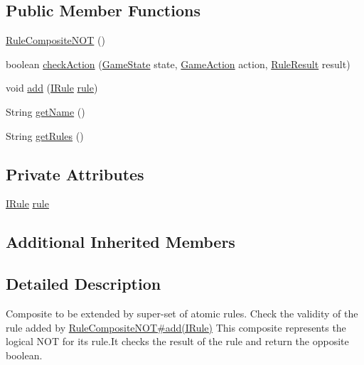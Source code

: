 \subsection*{Public Member Functions}
\begin{DoxyCompactItemize}
\item 
\mbox{\hyperlink{classrule_engine_1_1rules_1_1new_rules_1_1_rule_composite_n_o_t_a561e4770066c3d1791cf2541e909ad1e}{Rule\+Composite\+N\+OT}} ()
\item 
boolean \mbox{\hyperlink{classrule_engine_1_1rules_1_1new_rules_1_1_rule_composite_n_o_t_a58fe12e7cdc5cdcff6d0df2c67ecedb8}{check\+Action}} (\mbox{\hyperlink{classgame_1_1game_state_1_1_game_state}{Game\+State}} state, \mbox{\hyperlink{classrule_engine_1_1_game_action}{Game\+Action}} action, \mbox{\hyperlink{classrule_engine_1_1_rule_result}{Rule\+Result}} result)
\item 
void \mbox{\hyperlink{classrule_engine_1_1rules_1_1new_rules_1_1_rule_composite_n_o_t_ac478b4b84934bcddb1435dc6e83f3a83}{add}} (\mbox{\hyperlink{interfacerule_engine_1_1rules_1_1new_rules_1_1_i_rule}{I\+Rule}} \mbox{\hyperlink{classrule_engine_1_1rules_1_1new_rules_1_1_rule_composite_n_o_t_aa13491e8dba5f09e1451dc388ae9f9be}{rule}})
\item 
String \mbox{\hyperlink{classrule_engine_1_1rules_1_1new_rules_1_1_rule_composite_n_o_t_a1d11d1d08a50f98b26109859ae453aaa}{get\+Name}} ()
\item 
String \mbox{\hyperlink{classrule_engine_1_1rules_1_1new_rules_1_1_rule_composite_n_o_t_ac462ba010b03ab7af8dfa25705127945}{get\+Rules}} ()
\end{DoxyCompactItemize}
\subsection*{Private Attributes}
\begin{DoxyCompactItemize}
\item 
\mbox{\hyperlink{interfacerule_engine_1_1rules_1_1new_rules_1_1_i_rule}{I\+Rule}} \mbox{\hyperlink{classrule_engine_1_1rules_1_1new_rules_1_1_rule_composite_n_o_t_aa13491e8dba5f09e1451dc388ae9f9be}{rule}}
\end{DoxyCompactItemize}
\subsection*{Additional Inherited Members}


\subsection{Detailed Description}
Composite to be extended by super-\/set of atomic rules. Check the validity of the rule added by \mbox{\hyperlink{classrule_engine_1_1rules_1_1new_rules_1_1_rule_composite_n_o_t_ac478b4b84934bcddb1435dc6e83f3a83}{Rule\+Composite\+N\+O\+T\#add(\+I\+Rule)}} This composite represents the logical N\+OT for its rule.\+It checks the result of the rule and return the opposite boolean.

